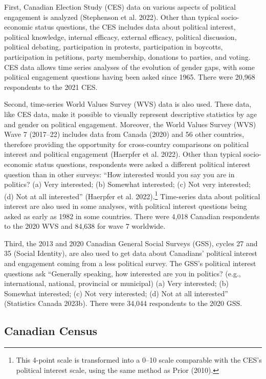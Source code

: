 \documentclass[
  letterpaper,
  DIV=11,
  numbers=noendperiod]{scrreprt}
\begin{document}
First, Canadian Election Study (CES) data on various aspects of
political engagement is analyzed (Stephenson et al. 2022). Other than
typical socio-economic status questions, the CES includes data about
political interest, political knowledge, internal efficacy, external
efficacy, political discussion, political debating, participation in
protests, participation in boycotts, participation in petitions, party
membership, donations to parties, and voting. CES data allows time
series analyses of the evolution of gender gaps, with some political
engagement questions having been asked since 1965. There were 20,968
respondents to the 2021 CES.

Second, time-series World Values Survey (WVS) data is also used. These
data, like CES data, make it possible to visually represent descriptive
statistics by age and gender on political engagement. Moreover, the
World Values Survey (WVS) Wave 7 (2017--22) includes data from Canada
(2020) and 56 other countries, therefore providing the opportunity for
cross-country comparisons on political interest and political engagement
(Haerpfer et al. 2022). Other than typical socio-economic status
questions, respondents were asked a different political interest
question than in other surveys: ``How interested would you say you are
in politics? (a) Very interested; (b) Somewhat interested; (c) Not very
interested; (d) Not at all interested'' (Haerpfer et al.
2022).\footnote{This 4-point scale is transformed into a 0--10 scale
  comparable with the CES's political interest scale, using the same
  method as Prior (2010).} Time-series data about political interest are
also used in some analyses, with political interest questions being
asked as early as 1982 in some countries. There were 4,018 Canadian
respondents to the 2020 WVS and 84,638 for wave 7 worldwide.

Third, the 2013 and 2020 Canadian General Social Surveys (GSS), cycles
27 and 35 (Social Identity), are also used to get data about Canadians'
political interest and engagement coming from a less political survey.
The GSS's political interest questions ask ``Generally speaking, how
interested are you in politics? (e.g., international, national,
provincial or municipal) (a) Very interested; (b) Somewhat interested;
(c) Not very interested; (d) Not at all interested'' (Statistics Canada
2023b). There were 34,044 respondents to the 2020 GSS.

\subsection{Canadian Census}\label{canadian-census}
\end{document}
